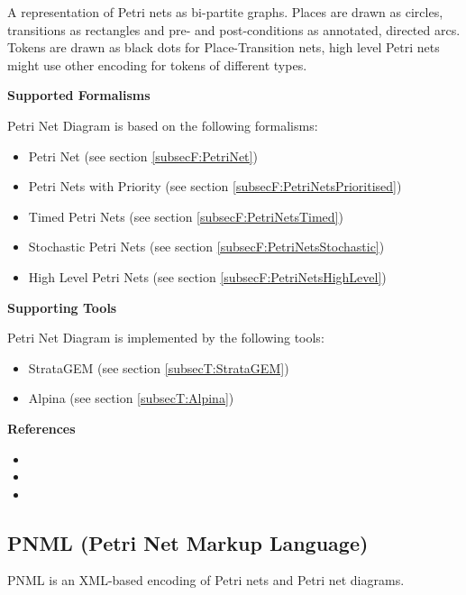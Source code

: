 A representation of Petri nets as bi-partite graphs. Places are drawn as circles, transitions as rectangles and pre- and post-conditions as annotated, directed arcs. Tokens are drawn as black dots for Place-Transition nets, high level Petri nets might use other encoding for tokens of different types.

\textbf{Supported Formalisms}

Petri Net Diagram is based on the following formalisms:
\begin{itemize}
	\item Petri Net (see section \ref{subsecF:PetriNet})
	\item Petri Nets with Priority (see section \ref{subsecF:PetriNetsPrioritised})
	\item Timed Petri Nets (see section \ref{subsecF:PetriNetsTimed})
	\item Stochastic Petri Nets (see section \ref{subsecF:PetriNetsStochastic})
	\item High Level Petri Nets (see section \ref{subsecF:PetriNetsHighLevel})
\end{itemize}


\textbf{Supporting Tools}

Petri Net Diagram is implemented by the following tools:
\begin{itemize}
	\item StrataGEM (see section \ref{subsecT:StrataGEM})
	\item Alpina (see section \ref{subsecT:Alpina})
\end{itemize}


\textbf{References}
\begin{itemize}
	
\item {}
	
\item {}
	
\item {}
\end{itemize}



\subsection{PNML (Petri Net Markup Language)}
\label{subsecL:PNML}


PNML is an XML-based encoding of Petri nets and Petri net diagrams.

